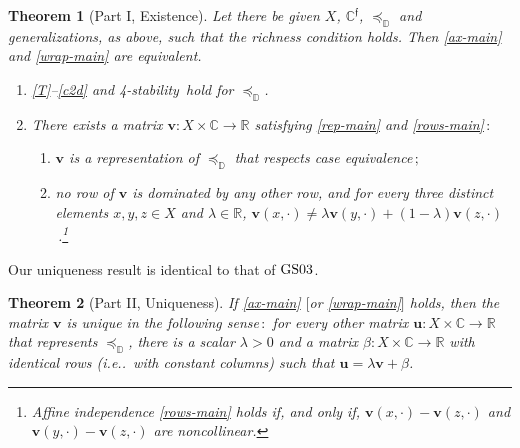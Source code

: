 \documentclass[ecta,nameyear,draft]{econsocart}
\makeatletter
\newcommand{\R}{\mathbb R}
\newcommand{\novel}{\mathfrak f}
\newcommand{\preceqb}{\mathbin{\preceq}}
\newcommand{\mbbd}{{\mathds D}}
\newcommand{\mbbc}{{\mathds C}}
\newcommand{\mbbcp}{{\mathds C^{\novel}}}
\newcommand{\mbbt}{{\mathds {T}}}
\newcommand{\stability}{\textit{4}-\textup{{stability}}}
\newcommand\ie{i\@.e\@ifnextchar.{}{.\@}}
\newcommand{\gsii}{$\textup{GS03}$}
\theoremstyle{plain}
\newtheorem{theorem}{Theorem}%
\theoremstyle{remark}
\makeatother
\begin{document}
\begin{theorem}[Part I, Existence]\label{thm-main} Let there be given $X$,
  $\mbbcp$, $\preceqb_ \mbbd$ and generalizations, as above, such that the
  richness condition holds. Then \ref{ax-main} and \ref{wrap-main} are
  equivalent.
  \begin{enumerate}[label=\textup{(\ref{thm-main}.\roman*)}]
    \item\label{ax-main} \ref{T}--\ref{c2d} and \stability\ hold for
      $\preceq_{\mbbd}$.
    \item\label{wrap-main} There exists a matrix $\mathbf{v} : X \times \mbbc
      \rightarrow \R$ satisfying \ref{rep-main} and \ref{rows-main}$\,:$
      \begin{enumerate}[label=\textup{(\ref{thm-main}.\alph*)}]
        \item\label{rep-main} $\mathbf{v}$ is a representation of
          $\preceq_{\mbbd}$ that respects case equivalence$\,;$
        \item\label{rows-main} no row of $\mathbf{v}$ is dominated by any other
          row, and for every three distinct elements $x,y, z \in X$ and
          $\lambda \in \R$, $\mathbf{v} (x, \cdot) \neq \lambda
          \mathbf{v}(y,\cdot) + (1-\lambda)
          \mathbf{v}(z,\cdot)$\,.\footnote{Affine independence \ref{rows-main}
            holds if, and only if, $\mathbf{v}(x,\cdot)- \mathbf{v}(z,\cdot)$
          and $\mathbf{v}(y,\cdot)-\mathbf{v}(z,\cdot)$ are noncollinear.}
      \end{enumerate}
  \end{enumerate}
\end{theorem}
Our uniqueness result is identical to that of \gsii.  \setcounter{theorem}{0}
\begin{theorem}[Part II, Uniqueness]%
  If \ref{ax-main} $[$or \ref{wrap-main}$]$ holds, then the matrix $\mathbf{v}$
  is unique in the following sense$\,:$ for every other matrix $\mathbf{u} : X
  \times \mbbc \rightarrow \R$ that represents $\preceqb_{\mbbd}$, there is a
  scalar $\lambda > 0$ and a matrix $\beta : X \times \mbbc \rightarrow \R$
  with identical rows (\ie\ with constant columns) such that $\mathbf{u} =
  \lambda \mathbf{v} + \beta$.
\end{theorem}

\end{document}
